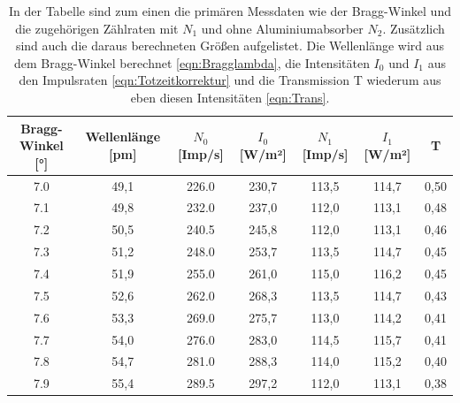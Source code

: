 \documentclass[titlepage = firstcover]{scrartcl}
\begin{document}
    \begin{table}[h]
        \centering
        \caption{In der Tabelle sind zum einen die primären Messdaten wie der Bragg-Winkel und die zugehörigen Zählraten mit $N_1$ und ohne Aluminiumabsorber $N_2$. Zusätzlich sind auch die daraus berechneten Größen aufgelistet. Die Wellenlänge wird aus dem Bragg-Winkel berechnet \ref{eqn:Bragglambda}, die Intensitäten $I_0$ und $I_1$ aus den Impulsraten \ref{eqn:Totzeitkorrektur} und die Transmission T wiederum aus eben diesen Intensitäten \ref{eqn:Trans}.}
        \label{tab:Transmission}

        \begin{tabular}{c c c c c c c}
            \toprule
            {Bragg-Winkel [°]}  & {Wellenlänge [pm]} & {$N_0$ [Imp/s]} & {$I_0$ [W/m²]} & {$N_1$ [Imp/s]} & {$I_1$ [W/m²]} & {T} \\ 
            \midrule
            7.0	                &  49,1              &  226.0          &    230,7       &    113,5        &    114,7       &  0,50 \\
            7.1	                &  49,8              &  232.0          &    237,0       &    112,0        &    113,1       &  0,48 \\
            7.2	                &  50,5              &  240.5          &    245,8       &    112,0        &    113,1       &  0,46 \\
            7.3	                &  51,2              &  248.0          &    253,7       &    113,5        &    114,7       &  0,45 \\
            7.4	                &  51,9              &  255.0          &    261,0       &    115,0        &    116,2       &  0,45 \\
            7.5	                &  52,6              &  262.0          &    268,3       &    113,5        &    114,7       &  0,43 \\
            7.6	                &  53,3              &  269.0          &    275,7       &    113,0        &    114,2       &  0,41 \\
            7.7	                &  54,0              &  276.0          &    283,0       &    114,5        &    115,7       &  0,41 \\
            7.8	                &  54,7              &  281.0          &    288,3       &    114,0        &    115,2       &  0,40 \\
            7.9	                &  55,4              &  289.5          &    297,2       &    112,0        &    113,1       &  0,38 \\

\end{tabular}
\end{table}
\end{document}
